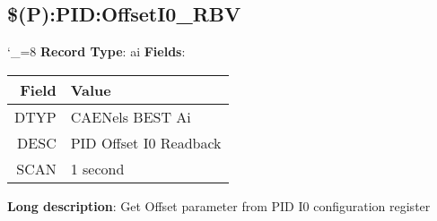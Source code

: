 \subsection{\$(P):PID:OffsetI0_RBV}
\catcode`_=8
\textbf{Record Type}: ai \newline \newline 
\textbf{Fields}: \newline 
\begin{tabularx}{0.7\linewidth}{|r|X|}
\hline Field & Value \\
\hline
\hline
DTYP & CAENels BEST Ai\\
\hline
DESC & PID Offset I0 Readback\\
\hline
SCAN & 1 second\\
\hline
\end{tabularx}
\newline \newline \newline
\textbf{Long description}: \newline 
 Get Offset parameter from PID I0 configuration register
\newline \newline